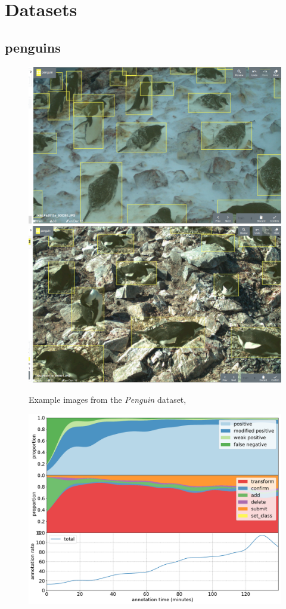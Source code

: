 \chapter{Datasets}
\label{chap:datasets} 


\pagebreak
\section{penguins}

\begin{figure}[!h]
\centering
  \includegraphics[width=0.475\linewidth]{figures/annotation/screenshots/penguins.png}
  \hfill
  \includegraphics[width=0.475\linewidth]{figures/annotation/screenshots/penguins2.png}

\caption{Example images from the \emph{Penguin} dataset, \cite{PenguinData}}
\label{fig:penguin_dataset}
\end{figure}

\begin{figure}[!h]
\centering
\includegraphics[width=1.0\linewidth]{charts/action_annotations/penguins.pdf}
\caption{  }
\label{fig:penguin_annotation}
\end{figure}



